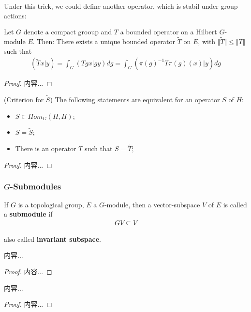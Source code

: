 \documentclass[Total.tex]{subfiles}
\begin{document}
					Under this trick, we could define another operator, which is stabil under group actions:
					\begin{lemma}
						Let $G$ denote a compact grooup and $T$ a bounded operator on a Hilbert $G$-module $E$. Then: There exists a unique bounded operator $\tilde{T}$ on $E$, with $\Vert\tilde{T}\Vert\leq \Vert T\Vert$ such that
						\begin{gather*}
							(\tilde{T}x|y)=\int_G (Tgx|gy)dg=\int_G  (\pi(g)^{-1}T\pi(g)(x)|y)dg
						\end{gather*}
					\end{lemma}
					\begin{proof}
						内容...
					\end{proof}
					
					\begin{proposition}
						(Criterion for $\tilde{S}$) The following statements are equivalent for an operator $S$ of $H$:
						\begin{itemize}
							\item $S\in Hom_G(H,H)$;
							\item $S=\tilde{S}$;
							\item There is an operator $T$ such that $S=\tilde{T}$;
						\end{itemize}
					\end{proposition}
					\begin{proof}
						内容...
					\end{proof}
					\subsubsection{$G$-Submodules}
					\begin{Def}
						If $G$ is a topological group, $E$ a $G$-module, then a vector-subspace $V$ of $E$ is called a \textbf{submodule} if
						\begin{gather*}
							GV\subseteq V
						\end{gather*}
						
						also called \textbf{invariant subspace}.
					\end{Def}
					\begin{lemma}
						内容...
					\end{lemma}
					\begin{proof}
						内容...
					\end{proof}
					
					\begin{lemma}
						内容...
					\end{lemma}
					\begin{proof}
						内容...
					\end{proof}
\end{document}
